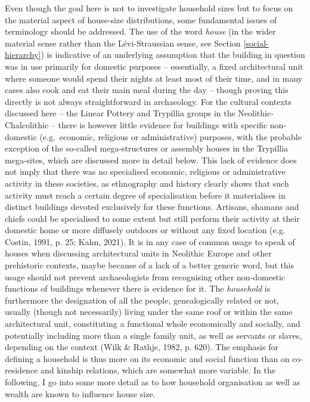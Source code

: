 \documentclass[
  12pt,
]{book}
\begin{document}
Even though the goal here is not to investigate household sizes but to focus on the material aspect of house-size distributions, some fundamental issues of terminology should be addressed. The use of the word \emph{house} (in the wider material sense rather than the Lévi-Straussian sense, see Section \ref{social-hierarchy}) is indicative of an underlying assumption that the building in question was in use primarily for domestic purposes -- essentially, a fixed architectural unit where someone would spend their nights at least most of their time, and in many cases also cook and eat their main meal during the day -- though proving this directly is not always straightforward in archaeology. For the cultural contexts discussed here -- the Linear Pottery and Trypillia groups in the Neolithic-Chalcolithic -- there is however little evidence for buildings with specific non-domestic (e.g.~economic, religious or administrative) purposes, with the probable exception of the so-called mega-structures or assembly houses in the Trypillia mega-sites, which are discussed more in detail below. This lack of evidence does not imply that there was no specialised economic, religious or administrative activity in these societies, as ethnography and history clearly shows that such activity must reach a certain degree of specialisation before it materialises in distinct buildings devoted exclusively for these functions. Artisans, shamans and chiefs could be specialised to some extent but still perform their activity at their domestic home or more diffusely outdoors or without any fixed location (e.g. Costin, 1991, p. 25; Kahn, 2021). It is in any case of common usage to speak of houses when discussing architectural units in Neolithic Europe and other prehistoric contexts, maybe because of a lack of a better generic word, but this usage should not prevent archaeologists from recognising other non-domestic functions of buildings whenever there is evidence for it. The \emph{household} is furthermore the designation of all the people, genealogically related or not, usually (though not necessarily) living under the same roof or within the same architectural unit, constituting a functional whole economically and socially, and potentially including more than a single family unit, as well as servants or slaves, depending on the context (Wilk \& Rathje, 1982, p. 620). The emphasis for defining a household is thus more on its economic and social function than on co-residence and kinship relations, which are somewhat more variable. In the following, I go into some more detail as to how household organisation as well as wealth are known to influence house size.
\end{document}
